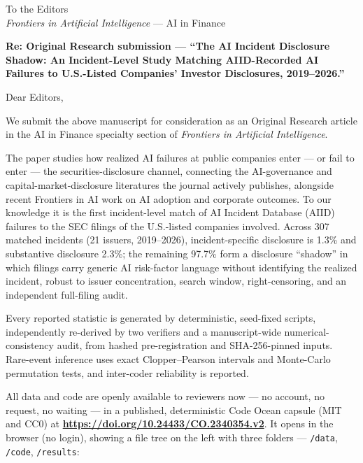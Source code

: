 \documentclass[11pt]{article}
\begin{document}
To the Editors\\
\emph{Frontiers in Artificial Intelligence} --- AI in Finance

\vspace{4pt}
\textbf{Re: Original Research submission --- ``The AI Incident Disclosure Shadow: An Incident-Level Study Matching AIID-Recorded AI Failures to U.S.-Listed Companies' Investor Disclosures, 2019--2026.''}

\vspace{6pt}
Dear Editors,

We submit the above manuscript for consideration as an Original Research article in the AI in Finance specialty section of \emph{Frontiers in Artificial Intelligence}.

The paper studies how realized AI failures at public companies enter --- or fail to enter --- the securities-disclosure channel, connecting the AI-governance and capital-market-disclosure literatures the journal actively publishes, alongside recent Frontiers in AI work on AI adoption and corporate outcomes. To our knowledge it is the first incident-level match of AI Incident Database (AIID) failures to the SEC filings of the U.S.-listed companies involved. Across 307 matched incidents (21 issuers, 2019--2026), incident-specific disclosure is 1.3\% and substantive disclosure 2.3\%; the remaining 97.7\% form a disclosure ``shadow'' in which filings carry generic AI risk-factor language without identifying the realized incident, robust to issuer concentration, search window, right-censoring, and an independent full-filing audit.

Every reported statistic is generated by deterministic, seed-fixed scripts, independently re-derived by two verifiers and a manuscript-wide numerical-consistency audit, from hashed pre-registration and SHA-256-pinned inputs. Rare-event inference uses exact Clopper--Pearson intervals and Monte-Carlo permutation tests, and inter-coder reliability is reported.

All data and code are openly available to reviewers now --- no account, no request, no waiting --- in a published, deterministic Code Ocean capsule (MIT and CC0) at \textbf{\url{https://doi.org/10.24433/CO.2340354.v2}}. It opens in the browser (no login), showing a file tree on the left with three folders --- \texttt{/data}, \texttt{/code}, \texttt{/results}:
\end{document}
